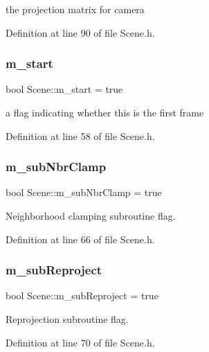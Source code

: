 the projection matrix for camera 



Definition at line 90 of file Scene.\+h.

\mbox{\label{class_scene_a5eb7172685e4b529af8e14eccfa23e82}} 
\subsubsection{m\_start}
{\footnotesize\ttfamily bool Scene\+::m\+\_\+start = true\hspace{0.3cm}{\ttfamily [private]}}



a flag indicating whether this is the first frame 



Definition at line 58 of file Scene.\+h.

\mbox{\label{class_scene_a3e80402d9342d3bddd6a0a9d5a365e0a}} 
\subsubsection{m\_subNbrClamp}
{\footnotesize\ttfamily bool Scene\+::m\+\_\+sub\+Nbr\+Clamp = true\hspace{0.3cm}{\ttfamily [private]}}



Neighborhood clamping subroutine flag. 



Definition at line 66 of file Scene.\+h.

\mbox{\label{class_scene_a0b9afb303085e85f55651ec1cf13eab7}} 
\subsubsection{m\_subReproject}
{\footnotesize\ttfamily bool Scene\+::m\+\_\+sub\+Reproject = true\hspace{0.3cm}{\ttfamily [private]}}



Reprojection subroutine flag. 



Definition at line 70 of file Scene.\+h.

\mbox{\label{class_scene_afde29e90e164cbfe7b4364d8981629ad}} 
